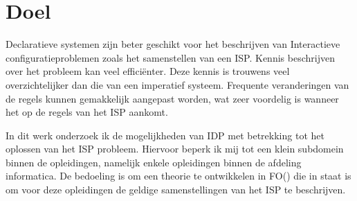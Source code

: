 \section{Doel}
Declaratieve systemen zijn beter geschikt voor het beschrijven van Interactieve configuratieproblemen zoals het samenstellen van een ISP. Kennis beschrijven over het probleem kan veel effici\"{e}nter. Deze kennis is trouwens veel overzichtelijker dan die van een imperatief systeem. Frequente veranderingen van de regels kunnen gemakkelijk aangepast worden, wat zeer voordelig is wanneer het op de regels van het ISP aankomt. 

In dit werk onderzoek ik de mogelijkheden van IDP met betrekking tot het oplossen van het ISP probleem. Hiervoor beperk ik mij tot een klein subdomein binnen de opleidingen, namelijk enkele opleidingen binnen de afdeling informatica. De bedoeling is om een theorie te ontwikkelen in FO(\textperiodcentered) die in staat is om voor deze opleidingen de geldige samenstellingen van het ISP te beschrijven. 

